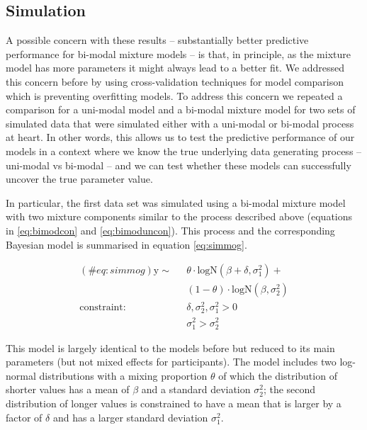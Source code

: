 \clearpage
\makeatletter
\efloat@restorefloats
\makeatother


\begin{appendix}
\section{}
\hypertarget{simulation}{%
\subsection{Simulation}\label{simulation}}

A possible concern with these results -- substantially better predictive
performance for bi-modal mixture models -- is that, in principle, as the
mixture model has more parameters it might always lead to a better fit.
We addressed this concern before by using cross-validation techniques
for model comparison which is preventing overfitting models. To address
this concern we repeated a comparison for a uni-modal model and a
bi-modal mixture model for two sets of simulated data that were
simulated either with a uni-modal or bi-modal process at heart. In other
words, this allows us to test the predictive performance of our models
in a context where we know the true underlying data generating process
-- uni-modal vs bi-modal -- and we can test whether these models can
successfully uncover the true parameter value.

In particular, the first data set was simulated using a bi-modal mixture
model with two mixture components similar to the process described above
(equations in \ref{eq:bimodcon} and \ref{eq:bimoduncon}). This process
and the corresponding Bayesian model is summarised in equation
\ref{eq:simmog}.

\begin{equation}
\begin{aligned}
(\#eq:simmog)
\text{y} \sim\text{ } & \theta \cdot \text{logN}(\beta + \delta, \sigma^2_1) +\\
& (1 - \theta) \cdot \text{logN}(\beta, \sigma^2_2)\\
\text{constraint: } & \delta, \sigma_\text{2}^2, \sigma_\text{1}^2>0\\
        & \sigma_{1}^2 > \sigma_{2}^2
\end{aligned}
\end{equation}

This model is largely identical to the models before but reduced to its
main parameters (but not mixed effects for participants). The model
includes two log-normal distributions with a mixing proportion
\(\theta\) of which the distribution of shorter values has a mean of
\(\beta\) and a standard deviation \(\sigma^2_2\); the second
distribution of longer values is constrained to have a mean that is
larger by a factor of \(\delta\) and has a larger standard deviation
\(\sigma^2_1\).


\end{appendix}
